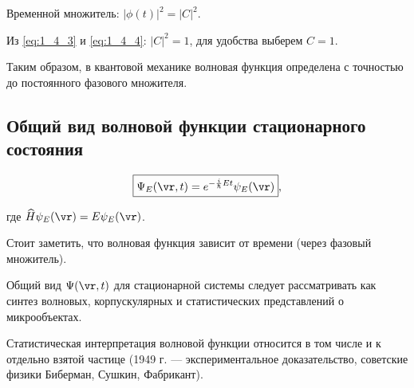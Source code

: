 Временной множитель: $|\phi (t)|^2= |C|^2$.

Из \eqref{eq:1_4_3} и \eqref{eq:1_4_4}: $|C|^2 = 1$, для удобства выберем $C = 1$.

Таким образом, в квантовой механике волновая функция определена с точностью до постоянного фазового множителя.

\subsection*{Общий вид волновой функции стационарного состояния}


$$\boxed{\Psi_E(\vr,t) = e^{-\frac{i}{\hbar}Et} \psi_E(\vr)},$$

где $\widehat{H} \psi_E(\vr) = E\psi_E(\vr)$.

Стоит заметить, что волновая функция зависит от времени (через фазовый множитель).

Общий вид $\Psi(\vr,t)$ для стационарной системы следует рассматривать как синтез волновых, корпускулярных и статистических представлений о микрообъектах. 

Статистическая интерпретация волновой функции относится в том числе и к отдельно взятой частице (1949 г. — экспериментальное доказательство, советские физики Биберман, Сушкин, Фабрикант).

